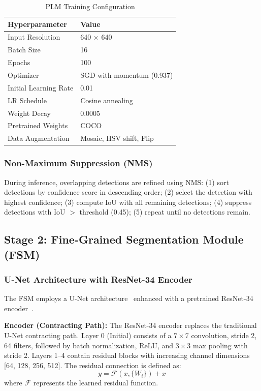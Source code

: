 \documentclass[conference]{IEEEtran}
\begin{document}
\begin{table}[htbp]
\caption{PLM Training Configuration}
\label{tab:plm_config}
\centering
\begin{tabular}{ll}
\toprule
\textbf{Hyperparameter} & \textbf{Value} \\
\midrule
Input Resolution & 640 $\times$ 640 \\
Batch Size & 16 \\
Epochs & 100 \\
Optimizer & SGD with momentum (0.937) \\
Initial Learning Rate & 0.01 \\
LR Schedule & Cosine annealing \\
Weight Decay & 0.0005 \\
Pretrained Weights & COCO \\
Data Augmentation & Mosaic, HSV shift, Flip \\
\bottomrule
\end{tabular}
\end{table}

\subsubsection{Non-Maximum Suppression (NMS)}
During inference, overlapping detections are refined using NMS: (1) sort detections by confidence score in descending order; (2) select the detection with highest confidence; (3) compute IoU with all remaining detections; (4) suppress detections with IoU $>$ threshold (0.45); (5) repeat until no detections remain.

\subsection{Stage 2: Fine-Grained Segmentation Module (FSM)}

\subsubsection{U-Net Architecture with ResNet-34 Encoder}
The FSM employs a U-Net architecture~\cite{ronneberger2015} enhanced with a pretrained ResNet-34 encoder~\cite{he2016}.

\textbf{Encoder (Contracting Path):} The ResNet-34 encoder replaces the traditional U-Net contracting path. Layer 0 (Initial) consists of a $7\times7$ convolution, stride 2, 64 filters, followed by batch normalization, ReLU, and $3\times3$ max pooling with stride 2. Layers 1--4 contain residual blocks with increasing channel dimensions [64, 128, 256, 512]. The residual connection is defined as:
\begin{equation}
    y = \mathcal{F}(x, \{W_i\}) + x
\end{equation}
where $\mathcal{F}$ represents the learned residual function.
\end{document}
